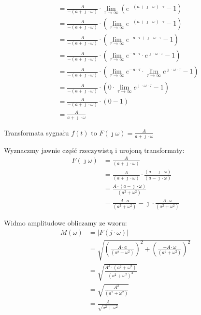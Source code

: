 \begin{task}
\begin{align*}
&=\frac{A}{-( a + \jmath \cdot \omega)} \cdot \lim_{\tau \rightarrow \infty} \left(e^{-( a + \jmath \cdot \omega) \cdot \tau} - 1\right)\\
&=\frac{A}{-( a + \jmath \cdot \omega)} \cdot \left(\lim_{\tau \rightarrow \infty} e^{-( a + \jmath \cdot \omega) \cdot \tau} - 1\right)\\
&=\frac{A}{-( a + \jmath \cdot \omega)} \cdot \left(\lim_{\tau \rightarrow \infty} e^{-a \cdot \tau + \jmath \cdot \omega \cdot \tau } - 1\right)\\
&=\frac{A}{-( a + \jmath \cdot \omega)} \cdot \left(\lim_{\tau \rightarrow \infty} e^{-a \cdot \tau} \cdot e^{\jmath \cdot \omega \cdot \tau } - 1\right)\\
&=\frac{A}{-( a + \jmath \cdot \omega)} \cdot \left(\lim_{\tau \rightarrow \infty} e^{-a \cdot \tau} \cdot \lim_{\tau \rightarrow \infty} e^{\jmath \cdot \omega \cdot \tau } - 1\right)\\
&=\frac{A}{-( a + \jmath \cdot \omega)} \cdot \left(0 \cdot \lim_{\tau \rightarrow \infty} e^{\jmath \cdot \omega \cdot \tau } - 1\right)\\
&=\frac{A}{-( a + \jmath \cdot \omega)} \cdot \left(0 - 1\right)\\
&=\frac{A}{a + \jmath \cdot \omega}
\end{align*}

Transformata sygnału $f(t)$ to $F(\jmath \omega)=\frac{A}{ a + \jmath \cdot \omega}$

Wyznaczmy jawnie część rzeczywistą i urojoną transformaty:
\begin{equation}
\begin{aligned}
F(\jmath \omega )&=\frac{A}{( a + \jmath \cdot \omega)}\\
&=\frac{A}{( a + \jmath \cdot \omega)} \cdot \frac{(a - \jmath \cdot \omega)}{(a - \jmath \cdot \omega)}\\
&=\frac{A \cdot ( a - \jmath \cdot \omega)}{( a^2 + \omega^2)}\\
&=\frac{A \cdot a}{( a^2 + \omega^2)} - \jmath \cdot \frac{A \cdot \omega}{( a^2 + \omega^2)}
\end{aligned}
\end{equation}


Widmo amplitudowe obliczamy ze wzoru:
\begin{equation}
\begin{aligned}
M(\omega)&=\left| F(j \cdot \omega) \right|\\
&=\sqrt{\left(\frac{A \cdot a}{( a^2 + \omega^2)}\right)^2 + \left(\frac{-A \cdot \omega}{( a^2 + \omega^2)}\right)^2}\\
&=\sqrt{\frac{A^2 \cdot (a^2+\omega^2)}{(a^2 + \omega^2)^2}}\\
&=\sqrt{\frac{A^2}{(a^2 + \omega^2)}}\\
&=\frac{A}{\sqrt{a^2 + \omega^2}}
\end{aligned}
\end{equation}


\end{task}

